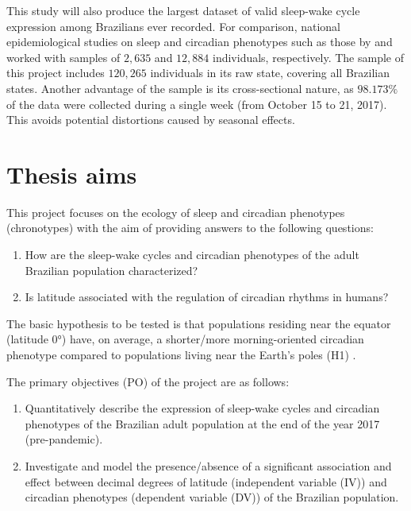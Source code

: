 \documentclass[
12pt,
openright,
oneside,
a4paper,
chapter=TITLE,
section=TITLE,
french,
spanish,
brazil,
english
]{abntex2}\usepackage{array}
\newcommand{\microskip}{\vspace{\microskipamount}}
\begin{document}
This study will also produce the largest dataset of valid sleep-wake
cycle expression among Brazilians ever recorded. For comparison,
national epidemiological studies on sleep and circadian phenotypes such
as those by \textcite{drager2022} and \textcite{leocadio-miguel2017}
worked with samples of \(2,635\) and \(12,884\) individuals,
respectively. The sample of this project includes \(120,265\)
individuals in its raw state, covering all Brazilian states. Another
advantage of the sample is its cross-sectional nature, as \(98.173\%\)
of the data were collected during a single week (from October 15 to 21,
2017). This avoids potential distortions caused by seasonal effects.

\section{Thesis aims}\label{thesis-aims}

This project focuses on the ecology of sleep and circadian phenotypes
(chronotypes) with the aim of providing answers to the following
questions:

\begin{enumerate}
\def\labelenumi{\arabic{enumi}.}
\item
  How are the sleep-wake cycles and circadian phenotypes of the adult
  Brazilian population characterized?
\item
  Is latitude associated with the regulation of circadian rhythms in
  humans?
\end{enumerate}

The basic hypothesis to be tested is that populations residing near the
equator (latitude 0°) have, on average, a shorter/more morning-oriented
circadian phenotype compared to populations living near the Earth's
poles (H1)
\autocite{hut2013,leocadio-miguel2014,leocadio-miguel2017,pittendrigh1991,randler2008,randler2017,roenneberg2003}.

The primary objectives (PO) of the project are as follows:

\microskip

\begin{enumerate}
\def\labelenumi{\Alph{enumi})}
\item
  Quantitatively describe the expression of sleep-wake cycles and
  circadian phenotypes of the Brazilian adult population at the end of
  the year 2017 (pre-pandemic).
\item
  Investigate and model the presence/absence of a significant
  association and effect between decimal degrees of latitude
  (independent variable (IV)) and circadian phenotypes (dependent
  variable (DV)) of the Brazilian population.
\end{enumerate}
\end{document}
